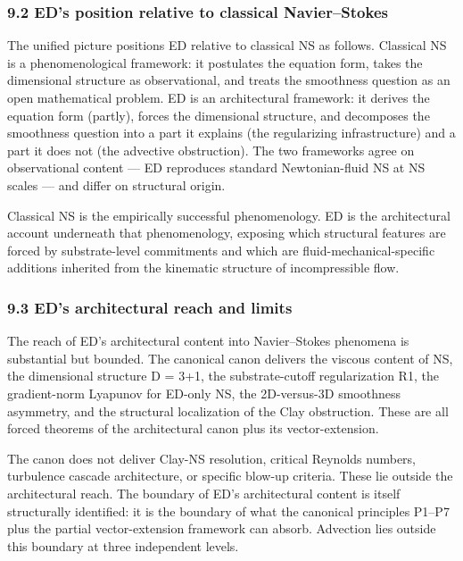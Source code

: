 \documentclass[
]{article}
\begin{document}
\subsubsection{9.2 ED's position relative to classical
Navier--Stokes}\label{eds-position-relative-to-classical-navierstokes}

The unified picture positions ED relative to classical NS as follows.
Classical NS is a phenomenological framework: it postulates the equation
form, takes the dimensional structure as observational, and treats the
smoothness question as an open mathematical problem. ED is an
architectural framework: it derives the equation form (partly), forces
the dimensional structure, and decomposes the smoothness question into a
part it explains (the regularizing infrastructure) and a part it does
not (the advective obstruction). The two frameworks agree on
observational content --- ED reproduces standard Newtonian-fluid NS at
NS scales --- and differ on structural origin.

Classical NS is the empirically successful phenomenology. ED is the
architectural account underneath that phenomenology, exposing which
structural features are forced by substrate-level commitments and which
are fluid-mechanical-specific additions inherited from the kinematic
structure of incompressible flow.

\subsubsection{9.3 ED's architectural reach and
limits}\label{eds-architectural-reach-and-limits}

The reach of ED's architectural content into Navier--Stokes phenomena is
substantial but bounded. The canonical canon delivers the viscous
content of NS, the dimensional structure D = 3+1, the substrate-cutoff
regularization R1, the gradient-norm Lyapunov for ED-only NS, the
2D-versus-3D smoothness asymmetry, and the structural localization of
the Clay obstruction. These are all forced theorems of the architectural
canon plus its vector-extension.

The canon does not deliver Clay-NS resolution, critical Reynolds
numbers, turbulence cascade architecture, or specific blow-up criteria.
These lie outside the architectural reach. The boundary of ED's
architectural content is itself structurally identified: it is the
boundary of what the canonical principles P1--P7 plus the partial
vector-extension framework can absorb. Advection lies outside this
boundary at three independent levels.
\end{document}
